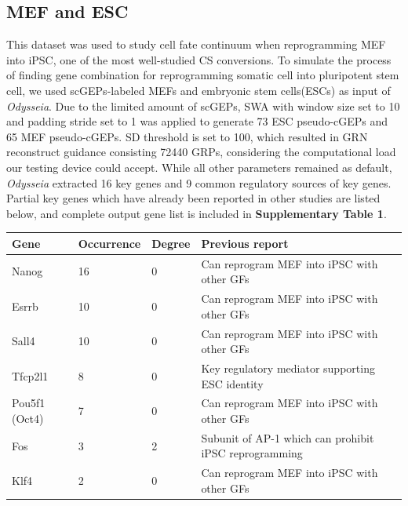 \documentclass[fleqn,10pt]{wlscirep}
\begin{document}
\subsection*{MEF and ESC}
This dataset was used to study cell fate continuum when reprogramming MEF into iPSC, one of the most well-studied CS conversions.\cite{mef_ipsc_cas}
To simulate the process of finding gene combination for reprogramming somatic cell into pluripotent stem cell, we used scGEPs-labeled MEFs and embryonic stem cells(ESCs) as input of \emph{Odysseia}.
Due to the limited amount of scGEPs, SWA with window size set to 10 and padding stride set to 1 was applied to generate 73 ESC pseudo-cGEPs and 65 MEF pseudo-cGEPs.
SD threshold is set to 100, which resulted in GRN reconstruct guidance consisting 72440 GRPs, considering the computational load our testing device could accept.
While all other parameters remained as default, \emph{Odysseia} extracted 16 key genes and 9 common regulatory sources of key genes.
Partial key genes which have already been reported in other studies are listed below, and complete output gene list is included in \textbf{Supplementary Table 1}.

\begin{table}[ht]
\centering
\begin{tabular}{|l|l|l|l|}
\hline
\textbf{Gene} & \textbf{Occurrence} & \textbf{Degree} & \textbf{Previous report}  \\
\hline
Nanog & 16 & 0 & Can reprogram MEF into iPSC with other GFs\cite{ips7f, oct4_nanog_sox2_lin28, oct4_nanog_sox2} \\
\hline
Esrrb & 10 & 0 & Can reprogram MEF into iPSC with other GFs\cite{ips7f, LIF_esrrb, gtmEsrrb_iPSC, JARID2_PRDM14_ESRRB_SALL4A} \\
\hline
Sall4 & 10 & 0 & Can reprogram MEF into iPSC with other GFs\cite{ips7f, JARID2_PRDM14_ESRRB_SALL4A} \\
\hline
Tfcp2l1 & 8 & 0 & Key regulatory mediator supporting ESC identity\cite{tfcp2l1_1, tfcp2l1_2} \\
\hline
Pou5f1 (Oct4) & 7 & 0 & Can reprogram MEF into iPSC with other GFs\cite{yamanaka_2006, oct4_nanog_sox2_lin28, oct4_nanog_sox2, ips2f, ipsOK, osk} \\
\hline
Fos & 3 & 2 & Subunit of AP-1 which can prohibit iPSC reprogramming\cite{ips7f, ipsAP1} \\
\hline
Klf4 & 2 & 0 & Can reprogram MEF into iPSC with other GFs\cite{yamanaka_2006, ips2f, ipsOK, osk} \\
\hline
\end{tabular}
\end{table}
\end{document}

